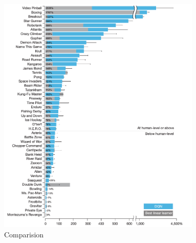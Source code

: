 \begin{figure}[h]
	\begin{center}
		\includegraphics[width=367px,height=435px]{src/img/state/comparision}
		\caption{Comparision\cite{nature}} \label{fig:comp}
    \end{center}
\end{figure}




















